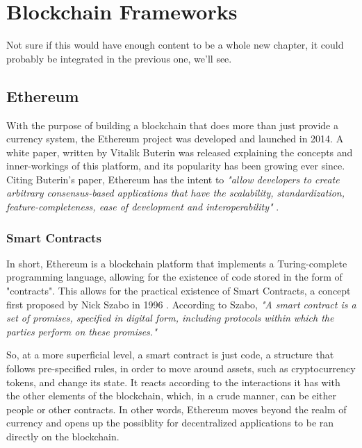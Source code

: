 \chapter{Blockchain Frameworks}
\label{chap:blockchain-frameworks}

Not sure if this would have enough content to be a whole new chapter, it could probably be integrated in the previous one, we'll see.


\section{Ethereum}

With the purpose of building a blockchain that does more than just provide a currency system, the Ethereum project was developed and launched in 2014. A white paper, written by Vitalik Buterin was released explaining the concepts and inner-workings of this platform, and its popularity has been growing ever since. Citing Buterin's paper, Ethereum has the intent to \textit{"allow developers to create arbitrary consensus-based applications that have the
scalability, standardization, feature-completeness, ease of development and interoperability" } \cite{Buterin2014}.

\subsection{Smart Contracts}
In short, Ethereum is a blockchain platform that implements a Turing-complete programming language, allowing for the existence of code stored in the form of "contracts". This allows for the practical existence of Smart Contracts, a concept first proposed by Nick Szabo in 1996 \cite{szabo1996smart}. According to Szabo, \textit{"A smart contract is a set of promises, specified in digital form, including protocols within which the parties perform on these promises."} 


So, at a more superficial level, a smart contract is just code, a structure that follows pre-specified rules, in order to move around assets, such as cryptocurrency tokens, and change its state. It reacts according to the interactions it has with the other elements of the blockchain, which, in a crude manner, can be either people or other contracts. In other words, Ethereum moves beyond the realm of currency and opens up the possiblity for decentralized applications to be ran directly on the blockchain. 

